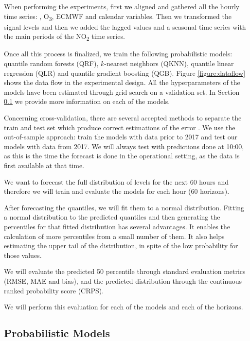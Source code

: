 \documentclass[a4paper,twocolumn,5p]{elsarticle}
\begin{document}
When performing the experiments, first we aligned and gathered all the
hourly time series: \no, O\textsubscript{3}, ECMWF and
calendar variables.  Then we transformed the signal levels and then we
added the lagged values and a seasonal time series with the main
periods of the NO\textsubscript{2} time series.

Once all this process is finalized, we train the following
probabilistic models: quantile random forests (QRF), $k$-nearest
neighbors (QKNN), quantile linear regression (QLR) and quantile
gradient boosting (QGB).  Figure \ref{figure:dataflow} shows the data
flow in the experimental design. All the hyperparameters of the models
have been estimated through grid search on a validation set.  
In Section \ref{sec:models}
we provide more information on each of the models.

Concerning cross-validation, there are several accepted methods to
separate the train and test set which produce correct estimations of
the error \cite{bergmeir_note_2018}. We use the out-of-sample
approach: train the models with data prior to 2017 and test our models
with data from 2017. We will always test with predictions done at
10:00, as this is the time the forecast is done in the operational
setting, as the data is first available at that time.

We want to forecast the full distribution of \no
levels for the next 60 hours and therefore we will train and evaluate
the models for each hour (60 horizons).

After forecasting the quantiles, we will fit them to a normal
distribution. Fitting a normal distribution to the predicted quantiles
and then generating the percentiles for that fitted distribution has
several advantages. It enables the calculation of more percentiles
from a small number of them.  It also helps estimating the upper tail
of the distribution, in spite of the low probability for those values.

We will evaluate the predicted 50 percentile through standard
evaluation metrics (RMSE, MAE and bias), and the predicted
distribution through the continuous ranked probability score (CRPS).

We will perform this evaluation for
each of the models and each of the horizons.

\subsection{Probabilistic Models}
\label{sec:models}
\end{document}
